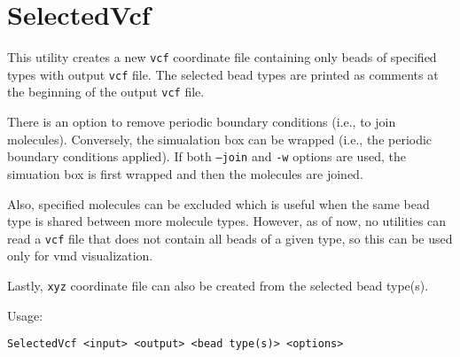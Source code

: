 \section{SelectedVcf} \label{sec:SelectedVcf}

This utility creates a new \texttt{vcf} coordinate file containing only
beads of specified types with output \texttt{vcf} file. The selected bead
types are printed as comments at the beginning of the output \texttt{vcf}
file.

There is an option to remove periodic boundary conditions (i.e., to join
molecules). Conversely, the simualation box can be wrapped (i.e., the
periodic boundary conditions applied). If both \texttt{--join} and
\texttt{-w} options are used, the simuation box is first wrapped and then
the molecules are joined.

Also, specified molecules can be excluded which is useful when the same
bead type is shared between more molecule types. However, as of now, no
utilities can read a \texttt{vcf} file that does not contain all beads of a
given type, so this can be used only for vmd visualization.

Lastly, \texttt{xyz} coordinate file can also be created from the selected
bead type(s).

Usage:

\vspace{1em}
\noindent
\texttt{SelectedVcf <input> <output> <bead type(s)> <options>}

